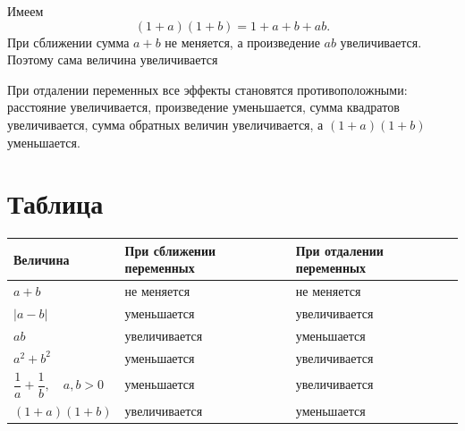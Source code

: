 Имеем
\[
(1+a)(1+b)=1+a+b+ab.
\]
При сближении сумма $a+b$ не меняется, а произведение $ab$ увеличивается. Поэтому сама величина увеличивается

\begin{remarkbox}
    При отдалении переменных все эффекты становятся противоположными: расстояние увеличивается, произведение уменьшается, сумма квадратов увеличивается, сумма обратных величин увеличивается, а $(1+a)(1+b)$ уменьшается.    
\end{remarkbox}


\medskip

\section{Таблица}



\begin{center}
\small
\setlength{\tabcolsep}{4pt}
\renewcommand{\arraystretch}{1.35}

\begin{center}
\small
\setlength{\tabcolsep}{6pt}
\renewcommand{\arraystretch}{1.35}

\begin{tabularx}{\textwidth}{
    >{\centering\arraybackslash}p{}
    >{\centering\arraybackslash}X
    >{\centering\arraybackslash}X
}
\toprule
\textbf{Величина}
&
\textbf{При сближении переменных}
&
\textbf{При отдалении переменных}
\\
\midrule

$a+b$
&
не меняется
&
не меняется
\\

\addlinespace[2mm]

$|a-b|$
&
уменьшается
&
увеличивается
\\

\addlinespace[2mm]

$ab$
&
увеличивается
&
уменьшается
\\

\addlinespace[2mm]

$a^2+b^2$
&
уменьшается
&
увеличивается
\\

\addlinespace[2mm]

$\dfrac1a+\dfrac1b,\quad a,b>0$
&
уменьшается
&
увеличивается
\\

\addlinespace[2mm]

$(1+a)(1+b)$
&
увеличивается
&
уменьшается
\\

\bottomrule
\end{tabularx}
\end{center}
\normalsize

\end{center}
\normalsize

